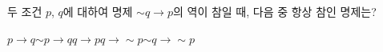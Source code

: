 두 조건 $p$, $q$에 대하여 명제 $\sim q\longrightarrow p$의 역이 참일 때, 다음 중 항상 참인 명제는?
\begin{choices32}{$p\longrightarrow q$}{$\sim p\longrightarrow q$}{$q\longrightarrow p$}{$q\longrightarrow \sim p$}{$\sim q\longrightarrow \sim p$}\end{choices32}
